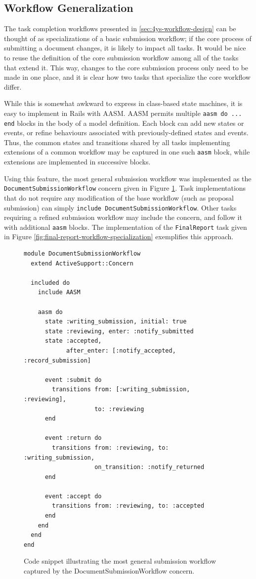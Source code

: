 \documentclass[document.tex]{subfiles}
\begin{document}
\subsection{Workflow Generalization}

The task completion workflows presented in \ref{sec:4ys-workflow-design} can be thought of as specializations of a basic submission workflow; if the core process of submitting a document changes, it is likely to impact all tasks. It would be nice to reuse the definition of the core submission workflow among all of the tasks that extend it. This way, changes to the core submission process only need to be made in one place, and it is clear how two tasks that specialize the core workflow differ.

While this is somewhat awkward to express in class-based state machines, it is easy to implement in Rails with AASM. AASM permits multiple \verb!aasm do ... end!
blocks in the body of a model definition. Each block can add new states or events, or refine behaviours associated with previously-defined states and events. Thus, the common states and transitions shared by all tasks implementing extensions of a common workflow may be captured in one such
\verb!aasm! block, while extensions are implemented in successive blocks.

Using this feature, the most general submission workflow was implemented as the \verb!DocumentSubmissionWorkflow! concern given in Figure
\ref{fig:document-submission-concern}. Task implementations that do not require any modification of the base workflow (such as proposal submission) can simply \verb!include DocumentSubmissionWorkflow!. Other tasks requiring a refined submission workflow may include the concern, and follow it with additional \verb!aasm! blocks. The implementation of the \verb!FinalReport! task given in Figure \ref{fig:final-report-workflow-specialization} exemplifies this approach.

\begin{figure}[!ht]
  \begin{lstlisting}
module DocumentSubmissionWorkflow
  extend ActiveSupport::Concern

  included do
    include AASM

    aasm do
      state :writing_submission, initial: true
      state :reviewing, enter: :notify_submitted
      state :accepted,
            after_enter: [:notify_accepted, :record_submission]

      event :submit do
        transitions from: [:writing_submission, :reviewing],
                    to: :reviewing
      end

      event :return do
        transitions from: :reviewing, to: :writing_submission,
                    on_transition: :notify_returned
      end

      event :accept do
        transitions from: :reviewing, to: :accepted
      end
    end
  end
end
  \end{lstlisting}
  \caption{Code snippet illustrating the most general submission workflow captured by the DocumentSubmissionWorkflow concern.}
  \label{fig:document-submission-concern}
\end{figure}
\end{document}
